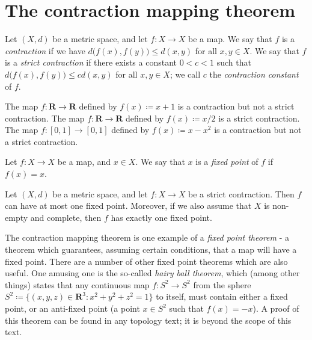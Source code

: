 \section{The contraction mapping theorem}\label{sec 6.6}

\begin{definition}[Contraction]\label{6.6.1}
    Let \((X, d)\) be a metric space, and let \(f : X \to X\) be a map.
    We say that \(f\) is a \emph{contraction} if we have \(d\big(f(x), f(y)\big) \leq d(x, y)\) for all \(x, y \in X\).
    We say that \(f\) is a \emph{strict contraction} if there exists a constant \(0 < c < 1\) such that \(d\big(f(x), f(y)\big) \leq c d(x, y)\) for all \(x, y \in X\);
    we call \(c\) the \emph{contraction constant} of \(f\).
\end{definition}

\begin{example}\label{6.6.2}
    The map \(f : \mathbf{R} \to \mathbf{R}\) defined by \(f(x) \coloneqq x + 1\) is a contraction but not a strict contraction.
    The map \(f : \mathbf{R} \to \mathbf{R}\) defined by \(f(x) \coloneqq x / 2\) is a strict contraction.
    The map \(f : [0, 1] \to [0, 1]\) defined by \(f(x) \coloneqq x - x^2\) is a contraction but not a strict contraction.
\end{example}

\begin{definition}\label{6.6.3}
    Let \(f : X \to X\) be a map, and \(x \in X\).
    We say that \(x\) is a \emph{fixed point} of \(f\) if \(f(x) = x\).
\end{definition}

\begin{theorem}\label{6.6.4}
    Let \((X, d)\) be a metric space, and let \(f : X \to X\) be a strict contraction.
    Then \(f\) can have at most one fixed point.
    Moreover, if we also assume that \(X\) is non-empty and complete, then \(f\) has exactly one fixed point.
\end{theorem}

\begin{remark}\label{6.6.5}
    The contraction mapping theorem is one example of a \emph{fixed point theorem}
    - a theorem which guarantees, assuming certain conditions, that a map will have a fixed point.
    There are a number of other fixed point theorems which are also useful.
    One amusing one is the so-called \emph{hairy ball theorem}, which (among other things) states that any continuous map \(f : S^2 \to S^2\) from the sphere \(S^2 \coloneqq \{(x, y, z) \in \mathbf{R}^3 : x^2 + y^2 + z^2 = 1\}\) to itself, must contain either a fixed point, or an anti-fixed point
    (a point \(x \in S^2\) such that \(f(x) = -x\)).
    A proof of this theorem can be found in any topology text;
    it is beyond the scope of this text.
\end{remark}

